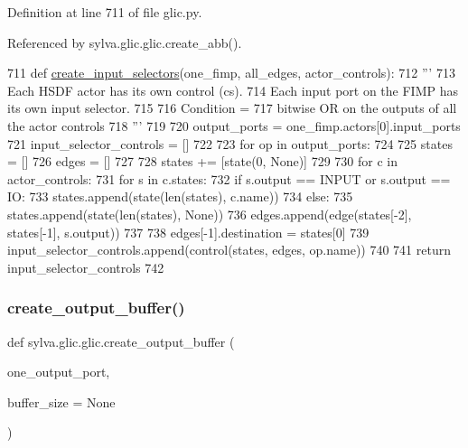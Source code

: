 Definition at line 711 of file glic.\+py.



Referenced by sylva.\+glic.\+glic.\+create\+\_\+abb().


\begin{DoxyCode}
711     \textcolor{keyword}{def }\hyperlink{namespacesylva_1_1glic_1_1glic_a28f028a55874a8d890d0df58905da73b}{create\_input\_selectors}(one\_fimp, all\_edges, actor\_controls):
712         \textcolor{stringliteral}{'''}
713 \textcolor{stringliteral}{          Each HSDF actor has its own control (cs).}
714 \textcolor{stringliteral}{          Each input port on the FIMP has its own input selector.}
715 \textcolor{stringliteral}{}
716 \textcolor{stringliteral}{          Condition =}
717 \textcolor{stringliteral}{            bitwise OR on the outputs of all the actor controls}
718 \textcolor{stringliteral}{        '''}
719 
720         output\_ports = one\_fimp.actors[0].input\_ports
721         input\_selector\_controls = []
722 
723         \textcolor{keywordflow}{for} op \textcolor{keywordflow}{in} output\_ports:
724 
725             states = []
726             edges = []
727 
728             states += [state(0, \textcolor{keywordtype}{None})]
729 
730             \textcolor{keywordflow}{for} c \textcolor{keywordflow}{in} actor\_controls:
731                 \textcolor{keywordflow}{for} s \textcolor{keywordflow}{in} c.states:
732                     \textcolor{keywordflow}{if} s.output == INPUT \textcolor{keywordflow}{or} s.output == IO:
733                         states.append(state(len(states), c.name))
734                     \textcolor{keywordflow}{else}:
735                         states.append(state(len(states), \textcolor{keywordtype}{None}))
736                     edges.append(edge(states[-2], states[-1], s.output))
737 
738             edges[-1].destination = states[0]
739             input\_selector\_controls.append(control(states, edges, op.name))
740 
741         \textcolor{keywordflow}{return} input\_selector\_controls
742 
\end{DoxyCode}
\mbox{\label{namespacesylva_1_1glic_1_1glic_a414741c04de0838d506dbeee050368a6}} 
\subsubsection{\texorpdfstring{create\+\_\+output\+\_\+buffer()}{create\_output\_buffer()}}
{\footnotesize\ttfamily def sylva.\+glic.\+glic.\+create\+\_\+output\+\_\+buffer (\begin{DoxyParamCaption}\item[{}]{one\+\_\+output\+\_\+port,  }\item[{}]{buffer\+\_\+size = {\ttfamily None} }\end{DoxyParamCaption})}

